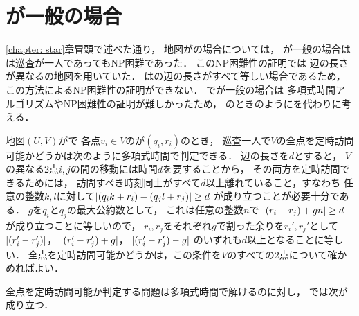 \section{{\maxIdletime}が一般の場合}
\ref{chapter: star}章冒頭で述べた通り，
地図が{\graphStar}の場合については，
{\maxIdletime}が一般の場合は
{\patProb}は巡査が一人であってもNP困難であった\cite[Theorem~6]{coene2011charlemagne}．
このNP困難性の証明では
辺の長さが異なる{\graphStar}の地図を用いていた．
{\graphUnit}は{\graphStar}の辺の長さがすべて等しい場合であるため，
この方法によるNP困難性の証明ができない．
{\graphUnit}で{\maxIdletime}が一般の場合は
多項式時間アルゴリズムやNP困難性の証明が難しかったため，
{\graphLine}のときのように{\timeSpecifiedPatProb}を代わりに考える．


地図$(U, V)$が{\graphUnit}で
各点$v_i \in V$の{\exactTime}が$(q_i, r_i)$のとき，
巡査一人で$V$の全点を定時訪問可能かどうかは次のように多項式時間で判定できる．
%
辺の長さを$d$とすると，
$V$の異なる2点$i, j$の間の移動には時間$d$を要することから，
その両方を定時訪問できるためには，
訪問すべき時刻同士がすべて$d$以上離れていること，すなわち
任意の整数$k, l$に対して$\lvert{(q_i k + r_i) - (q_j l + r_j)}\rvert \geq d$%
が成り立つことが必要十分である．
$g$を$q_i$と$q_j$の最大公約数として，
これは任意の整数$n$で
$\lvert{(r_i - r_j) + gn}\rvert \geq d$%
が成り立つことに等しいので，
$r_i, r_j$をそれぞれ$g$で割った余りを$r_i', r_j'$として
$\lvert{(r_i' - r_j')}\rvert$，
$\lvert{(r_i' - r_j') + g}\rvert$，
$\lvert{(r_i' - r_j') - g}\rvert$%
のいずれも$d$以上となることに等しい．
%
全点を定時訪問可能かどうかは，この条件を$V$のすべての2点について確かめればよい．

全点を定時訪問可能か判定する問題は多項式時間で解けるのに対し，
{\timeSpecifiedPatProb}では次が成り立つ．


